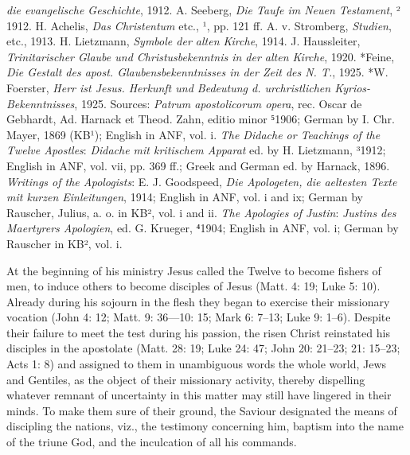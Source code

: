 \emph{die evangelische Geschichte}, 1912. A. Seeberg, \emph{Die Taufe im Neuen Testament}, ² 1912. H. Achelis, \emph{Das Christentum} etc., ¹, pp. 121 ff. A. v. Stromberg, \emph{Studien}, etc., 1913. H. Lietzmann, \emph{Symbole der alten Kirche}, 1914. J. Haussleiter, \emph{Trinitarischer Glaube und Christusbekenntnis in der alten Kirche}, 1920. *Feine, \emph{Die Gestalt des apost. Glaubensbekenntnisses in der Zeit des N. T.}, 1925. *W. Foerster, \emph{Herr ist Jesus. Herkunft und Bedeutung d. urchristlichen Kyrios-Bekenntnisses}, 1925. Sources: \emph{Patrum apostolicorum opera}, rec. Oscar de Gebhardt, Ad. Harnack et Theod. Zahn, editio minor ⁵1906; German by I. Chr. Mayer, 1869 (KB¹); English in ANF, vol. i. \emph{The Didache or Teachings of the Twelve Apostles}: \emph{Didache mit kritischem Apparat} ed. by H. Lietzmann, ³1912; English in ANF, vol. vii, pp. 369 ff.; Greek and German ed. by Harnack, 1896. \emph{Writings of the Apologists}: E. J. Goodspeed, \emph{Die Apologeten, die aeltesten Texte mit kurzen Einleitungen}, 1914; English in ANF, vol. i and ix; German by Rauscher, Julius, a. o. in KB², vol. i and ii. \emph{The Apologies of Justin}: \emph{Justins des Maertyrers Apologien}, ed. G. Krueger, ⁴1904; English in ANF, vol. i; German by Rauscher in KB², vol. i.

At the beginning of his ministry Jesus called the Twelve to become fishers of men, to induce others to become disciples of Jesus (Matt. 4: 19; Luke 5: 10). Already during his sojourn in the flesh they began to exercise their missionary vocation (John 4: 12; Matt. 9: 36—10: 15; Mark 6: 7–13; Luke 9: 1–6). Despite their failure to meet the test during his passion, the risen Christ reinstated his disciples in the apostolate (Matt. 28: 19; Luke 24: 47; John 20: 21–23; 21: 15–23; Acts 1: 8) and assigned to them in unambiguous words the whole world, Jews and Gentiles, as the object of their missionary activity, thereby dispelling whatever remnant of uncertainty in this matter may still have lingered in their minds. To make them sure of their ground, the Saviour designated the means of discipling the nations, viz., the testimony concerning him, baptism into the name of the triune God, and the inculcation of all his commands.

